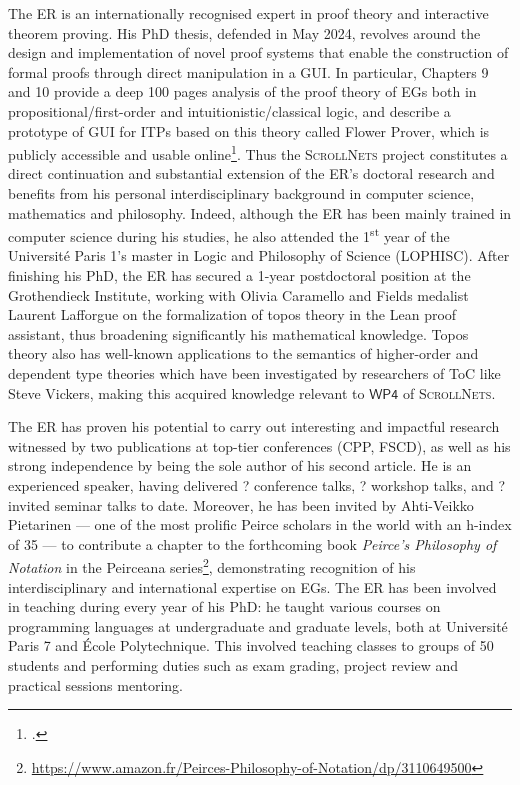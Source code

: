 \documentclass[11pt]{msca-pf}
\newcommand{\proj}{\small\textsc{ScrollNets}}
\newcommand{\WP}[1]{$\mathsf{WP#1}$}
\begin{document}
The ER is an internationally recognised expert in proof theory and interactive theorem proving. His
PhD thesis, defended in May 2024, revolves around the design and implementation of novel proof
systems that enable the construction of formal proofs through direct manipulation in a GUI. In
particular, Chapters 9 and 10 provide a deep 100 pages analysis of the proof theory of EGs both in
propositional/first-order and intuitionistic/classical logic, and describe a prototype of GUI for
ITPs based on this theory called Flower Prover, which is publicly accessible and usable
online\footcite{flower-prover}. Thus the {\proj} project constitutes a direct continuation and
substantial extension of the ER's doctoral research and benefits from his personal interdisciplinary
background in computer science, mathematics and philosophy. Indeed, although the ER has been mainly
trained in computer science during his studies, he also attended the 1\textsuperscript{st} year of
the Université Paris 1's master in Logic and Philosophy of Science (LOPHISC). After finishing his
PhD, the ER has secured a 1-year postdoctoral position at the Grothendieck Institute, working with
Olivia Caramello and Fields medalist Laurent Lafforgue on the formalization of topos theory in the
Lean proof assistant, thus broadening significantly his mathematical knowledge. Topos theory also
has well-known applications to the semantics of higher-order and dependent type theories which have
been investigated by researchers of ToC like Steve Vickers, making this acquired knowledge relevant
to \WP{4} of {\proj}.

The ER has proven his potential to carry out interesting and impactful research witnessed by two
publications at top-tier conferences (CPP, FSCD), as well as his strong independence by being the
sole author of his second article. He is an experienced speaker, having delivered ? conference
talks, ? workshop talks, and ? invited seminar talks to date. Moreover, he has been invited by
Ahti-Veikko Pietarinen --- one of the most prolific Peirce scholars in the world with an h-index of
35 --- to contribute a chapter to the forthcoming book \textit{Peirce’s Philosophy of Notation} in
the Peirceana
series\footnote{\url{https://www.amazon.fr/Peirces-Philosophy-of-Notation/dp/3110649500}},
demonstrating recognition of his interdisciplinary and international expertise on EGs. The ER has
been involved in teaching during every year of his PhD: he taught various courses on programming
languages at undergraduate and graduate levels, both at Université Paris 7 and École Polytechnique.
This involved teaching classes to groups of 50 students and performing duties such as exam grading,
project review and practical sessions mentoring.
\end{document}

